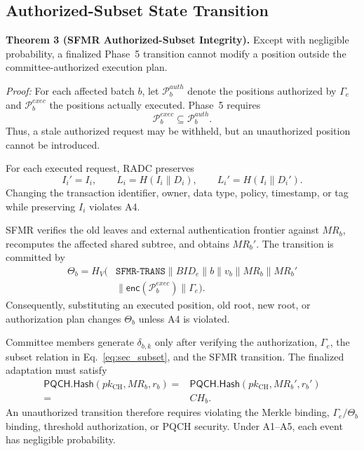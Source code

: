 \documentclass[lettersize,journal]{IEEEtran}
\begin{document}
\subsection{Authorized-Subset State Transition}

\textbf{Theorem 3 (SFMR Authorized-Subset Integrity).}
Except with negligible probability, a finalized Phase~5 transition
cannot modify a position outside the committee-authorized execution
plan.

\emph{Proof:}
For each affected batch $b$, let
$\mathcal{P}_b^{auth}$ denote the positions authorized by
$\Gamma_e$ and $\mathcal{P}_b^{exec}$ the positions actually executed.
Phase~5 requires
\begin{equation}
\mathcal{P}_b^{exec}\subseteq\mathcal{P}_b^{auth}.
\label{eq:sec_subset}
\end{equation}
Thus, a stale authorized request may be withheld, but an unauthorized
position cannot be introduced.

For each executed request, RADC preserves
\begin{equation}
I_i'=I_i,
\qquad
L_i=H(I_i\parallel D_i),
\qquad
L_i'=H(I_i\parallel D_i').
\end{equation}
Changing the transaction identifier, owner, data type, policy,
timestamp, or tag while preserving $I_i$ violates A4.

SFMR verifies the old leaves and external authentication frontier
against $MR_b$, recomputes the affected shared subtree, and obtains
$MR_b'$. The transition is committed by
\begin{equation}
\begin{aligned}
\Theta_b=H_V(&\texttt{SFMR-TRANS}\parallel BID_e\parallel b
\parallel v_b\parallel MR_b\parallel MR_b'\\
&\parallel\mathsf{enc}(\mathcal{P}_b^{exec})
\parallel\Gamma_e).
\end{aligned}
\label{eq:sec_theta}
\end{equation}
Consequently, substituting an executed position, old root, new root,
or authorization plan changes $\Theta_b$ unless A4 is violated.

Committee members generate $\delta_{b,k}$ only after verifying the
authorization, $\Gamma_e$, the subset relation in
Eq.~\eqref{eq:sec_subset}, and the SFMR transition. The finalized
adaptation must satisfy
\begin{equation}
\begin{split}
\mathsf{PQCH.Hash}(pk_{\mathrm{CH}},MR_b,r_b)
={}&
\mathsf{PQCH.Hash}(pk_{\mathrm{CH}},MR_b',r_b')\\
={}&CH_b.
\end{split}
\label{eq:sec_pqch_continuity}
\end{equation}
An unauthorized transition therefore requires violating the Merkle
binding, $\Gamma_e/\Theta_b$ binding, threshold authorization, or
PQCH security. Under A1--A5, each event has negligible probability.
\end{document}
